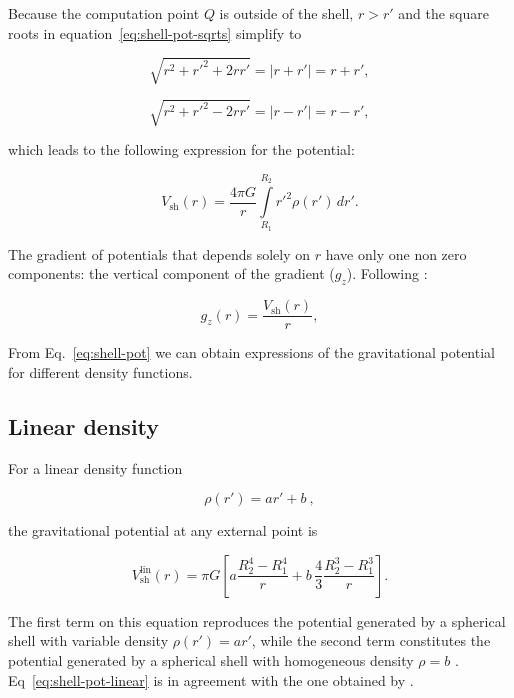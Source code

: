 \documentclass[extra, referee]{gji}
\begin{document}
Because the computation point $Q$ is outside of the shell, $r > r'$ and the square roots
in equation~\ref{eq:shell-pot-sqrts} simplify to

\begin{equation}
    \sqrt{r^2 + r'^2 + 2rr'} = |r + r'| = r + r',
\end{equation}

\begin{equation}
    \sqrt{r^2 + r'^2 - 2rr'} = |r - r'| = r - r',
\end{equation}

\noindent which leads to the following expression for the potential:

\begin{equation}
    V_\text{sh}(r) = \frac{4\pi G}{r}
    \int\limits_{R_1}^{R_2} {r'}^2 \rho(r') \, dr'.
\label{eq:shell-pot}
\end{equation}

The gradient of potentials that
depends solely on $r$ have only one non zero components: the vertical
component of the gradient ($g_z$).
Following \citet{Grombein2013}:

\begin{equation}
    g_z(r) = \frac{V_\text{sh}(r)}{r},
\label{eq:shell-gz}
\end{equation}

From Eq.~\ref{eq:shell-pot} we can obtain expressions of the gravitational potential for
different density functions.

\subsection{Linear density}

For a linear density function

\begin{equation}
    \rho(r') = ar' + b\ ,
\end{equation}

\noindent
the gravitational potential at any external point is

\begin{equation}
    V_\text{sh}^\text{lin}(r) = \pi G \left[
    a \frac{R_2^4 - R_1^4}{r} +
    b \,\frac{4}{3} \frac{R_2^3 - R_1^3}{r} \right].
    \label{eq:shell-pot-linear}
\end{equation}

\noindent The first term on this equation reproduces the potential generated
by a spherical shell with variable density $\rho(r') = ar'$, while the second
term constitutes the potential generated by a spherical shell with homogeneous
density $\rho = b$ \citep{Mikuska2006,Grombein2013}.
Eq~\ref{eq:shell-pot-linear} is in agreement with the one obtained by \citet{Lin2018}.
\end{document}
